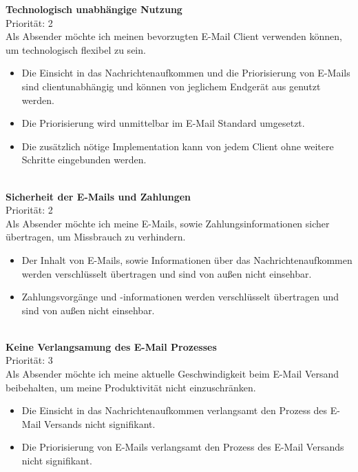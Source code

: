 \noindent 
\textbf{Technologisch unabhängige Nutzung} \\
Priorität: 2 \\
Als Absender möchte ich meinen bevorzugten E-Mail Client verwenden können, um technologisch flexibel zu sein.
\begin{itemize}
    \item Die Einsicht in das Nachrichtenaufkommen und die Priorisierung von E-Mails sind clientunabhängig und können von jeglichem Endgerät aus genutzt werden.
    \item Die Priorisierung wird unmittelbar im E-Mail Standard umgesetzt.
    \item Die zusätzlich nötige Implementation kann von jedem Client ohne weitere Schritte eingebunden werden.
\end{itemize}

\noindent 
\\ \textbf{Sicherheit der E-Mails und Zahlungen} \\
Priorität: 2 \\
Als Absender möchte ich meine E-Mails, sowie Zahlungsinformationen sicher übertragen, um Missbrauch zu verhindern.
\begin{itemize}
    \item Der Inhalt von E-Mails, sowie Informationen über das Nachrichtenaufkommen werden verschlüsselt übertragen und sind von außen nicht einsehbar.
    \item Zahlungsvorgänge und -informationen werden verschlüsselt übertragen und sind von außen nicht einsehbar.
\end{itemize}

\noindent 
\\ \textbf{Keine Verlangsamung des E-Mail Prozesses} \\
Priorität: 3 \\
Als Absender möchte ich meine aktuelle Geschwindigkeit beim E-Mail Versand beibehalten, um meine Produktivität nicht einzuschränken.
\begin{itemize}
    \item Die Einsicht in das Nachrichtenaufkommen verlangsamt den Prozess des E-Mail Versands nicht signifikant.
    \item Die Priorisierung von E-Mails verlangsamt den Prozess des E-Mail Versands nicht signifikant.
\end{itemize}


